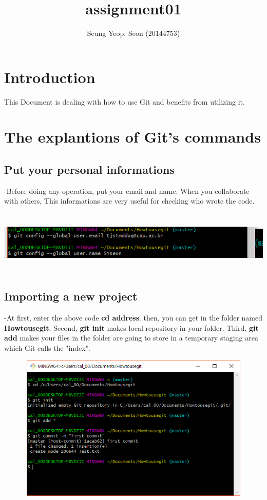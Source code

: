 \documentclass[11pt]{article}
\title{assignment01}
\author{Seung Yeop, Seon (20144753)}
\begin{document}
\maketitle
\section{Introduction}
 This Document is dealing with how to use Git and benefits from utilizing it.
\section{The explantions of Git's commands}
	\subsection{Put your personal informations}
	-Before doing any operation, put your email and name. When you collaborate with others, This informations are very useful for checking who wrote the code.

	\includegraphics[height=3cm, width=14cm]{c02.PNG}

	\subsection{Importing a new project}
	-At first, enter the above code \textbf{cd address}. then, you can get in the folder named \textbf{Howtousegit}. Second, \textbf{git init} makes local repository in your folder. Third,  \textbf{git add} makes your files in the folder are going to store in a temporary staging area which Git calls the "index".

	\includegraphics[height=7cm, width=14cm]{c01.PNG}
\end{document}
